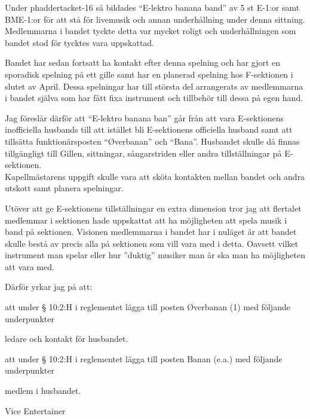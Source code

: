 \documentclass[../_main/handlingar.tex]{subfiles}
\begin{document}
Under phaddertacket-16 så bildades ``E-lektro banana band'' av 5 st E-1:or samt BME-1:or för att stå för livemusik och annan underhållning under denna sittning.
Medlemmarna i bandet tyckte detta var mycket roligt och underhållningen som bandet stod för tycktes vara uppskattad.

Bandet har sedan fortsatt ha kontakt efter denna spelning och har gjort en sporadisk spelning på ett gille samt har en planerad spelning hos F-sektionen i slutet av April. Dessa spelningar har till största del arrangerats av medlemmarna i bandet själva som har fått fixa instrument och tillbehör till dessa på egen hand.

Jag föreslår därför att ``E-lektro banana ban'' går från att vara E-sektionens inofficiella husbands till att istället bli E-sektionens officiella husband samt att tillsätta funktionärsposten ``Øverbanan'' och ``Bana''. Husbandet skulle då finnas tillgängligt till Gillen, sittningar, sångarstriden eller andra tillställningar på E-sektionen.
\\Kapellmästarens uppgift skulle vara att sköta kontakten mellan bandet och andra utskott samt planera spelningar.

Utöver att ge E-sektionens tillställningar en extra dimension tror jag att flertalet medlemmar i sektionen hade uppskattat att ha möjligheten att spela musik i band på sektionen. Visionen medlemmarna i bandet har i nuläget är att bandet skulle bestå av precis alla på sektionen som vill vara med i detta. Oavsett vilket instrument man spelar eller hur ”duktig” musiker man är ska man ha möjligheten att vara med.

Därför yrkar jag på att:
\begin{attsatser}
    \att att under § 10:2:H i reglementet lägga till posten Øverbanan (1) med följande underpunkter
    \begin{itshape}
    \begin{itemizedash}
            \item ledare och kontakt för husbandet.
     \end{itemizedash}
     \end{itshape}
     \att att under § 10:2:H i reglementet lägga till posten Banan (e.a.) med följande underpunkter
     \begin{itshape}
     \begin{itemizedash}
             \item medlem i husbandet.
      \end{itemizedash}
      \end{itshape}
\end{attsatser}

\begin{signatures}{1}
    \mvh
    \signature{Max Mauritsson}{Vice Entertainer}
\end{signatures}
\end{document}
